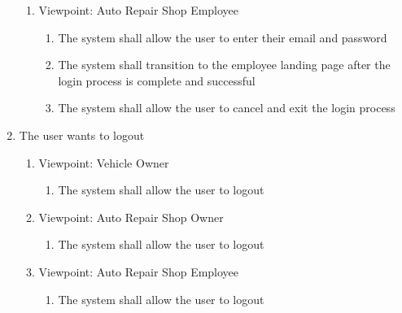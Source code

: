 \documentclass[12pt]{article}
\begin{document}
\begin{enumerate}[label=BE\arabic*., series=business_events]
\begin{enumerate}[VP\arabic*.]
		      \item Viewpoint: Auto Repair Shop Employee
		            \begin{enumerate}
			            \item The system shall allow the user to enter their email and password
			            \item The system shall transition to the employee landing page after the login process is complete and
			                  successful
			            \item The system shall allow the user to cancel and exit the login process
		            \end{enumerate}
	      \end{enumerate}

	\item The user wants to logout
	      \begin{enumerate}[VP\arabic*.]
		      \item Viewpoint: Vehicle Owner
		            \begin{enumerate}
			            \item The system shall allow the user to logout
		            \end{enumerate}

		      \item Viewpoint: Auto Repair Shop Owner
		            \begin{enumerate}
			            \item The system shall allow the user to logout
		            \end{enumerate}

		      \item Viewpoint: Auto Repair Shop Employee
		            \begin{enumerate}
			            \item The system shall allow the user to logout
		            \end{enumerate}
	      \end{enumerate}
\end{enumerate}
\end{document}

